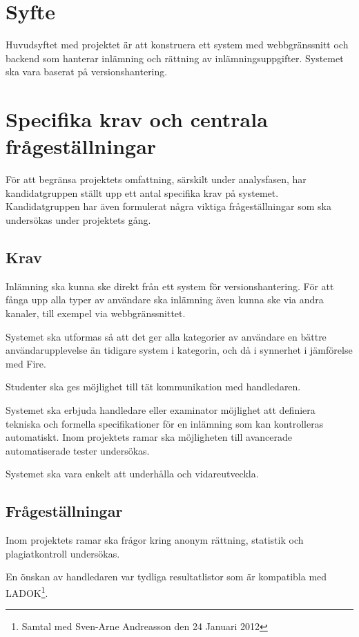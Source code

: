 \section{Syfte}

Huvudsyftet med projektet är att konstruera ett system med webbgränssnitt och
backend som hanterar inlämning och rättning av inlämningsuppgifter. Systemet ska
vara baserat på versionshantering.

\section{Specifika krav och centrala frågeställningar}

För att begränsa projektets omfattning, särskilt under analysfasen, har kandidatgruppen
ställt upp ett antal specifika krav på systemet.
Kandidatgruppen har även formulerat några viktiga frågeställningar som ska undersökas under projektets gång.

\subsection{Krav}

Inlämning ska kunna ske direkt från ett system för versionshantering. 
För att fånga upp alla typer av användare ska inlämning även kunna ske via andra kanaler, till exempel via webbgränssnittet.

Systemet ska utformas så att det ger alla kategorier av användare en bättre användarupplevelse än 
tidigare system i kategorin, och då i synnerhet i jämförelse med Fire.

Studenter ska ges möjlighet till tät kommunikation med handledaren.

Systemet ska erbjuda handledare eller examinator möjlighet att definiera tekniska och formella specifikationer för en inlämning som kan kontrolleras automatiskt. Inom projektets ramar ska möjligheten till avancerade automatiserade tester undersökas.

Systemet ska vara enkelt att underhålla och vidareutveckla.

\subsection{Frågeställningar}

Inom projektets ramar ska frågor kring anonym rättning, statistik och plagiatkontroll undersökas.

En önskan av handledaren var tydliga resultatlistor som är kompatibla med LADOK\footnote{Samtal med Sven-Arne Andreasson den 24 Januari 2012}.

